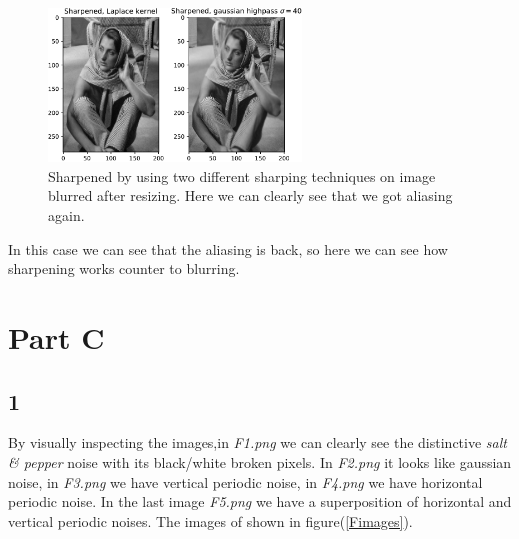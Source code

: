 {\begin{figure}[!htb]
    {\centering
        \includegraphics[width=0.60\textwidth]{sharpened2.pdf}
        \caption{Sharpened by using two different sharping techniques on image blurred after resizing. Here we can clearly see that we got aliasing again.}
        \label{sharpened2}
    \par}
    \end{figure}
In this case we can see that the aliasing is back, so here we can see how sharpening works counter to blurring.


\section{Part C}
\subsection{1}


By visually inspecting the images,in \emph{F1.png} we can clearly see the distinctive \emph{salt \& pepper} noise with its black/white broken pixels. In \emph{F2.png} it looks like gaussian noise, in \emph{F3.png} we have vertical periodic noise, in \emph{F4.png} we have horizontal periodic noise. In the last image \emph{F5.png} we have a superposition of horizontal and vertical periodic noises. The images of shown in figure(\ref{Fimages}).


}
